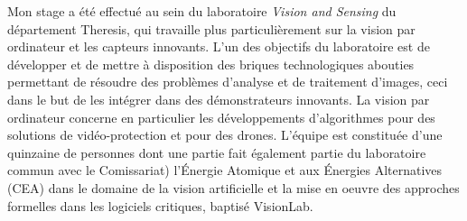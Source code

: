 Mon stage a été effectué au sein du laboratoire \textit{Vision and Sensing} du département Theresis, qui travaille plus particulièrement sur la vision par ordinateur et les capteurs innovants. L'un des objectifs du laboratoire est de développer et de mettre à disposition des briques technologiques abouties permettant de résoudre des problèmes d'analyse et de traitement d'images, ceci dans le but de les intégrer dans des démonstrateurs innovants. La vision par ordinateur concerne en particulier les développements d'algorithmes pour des solutions de vidéo-protection et pour des drones. L'équipe est constituée d'une quinzaine de personnes dont une partie fait également partie du laboratoire commun avec le Comissariat) l'Énergie Atomique et aux Énergies Alternatives (CEA) dans le domaine de la vision artificielle et la mise en oeuvre des approches formelles dans les logiciels critiques, baptisé VisionLab.